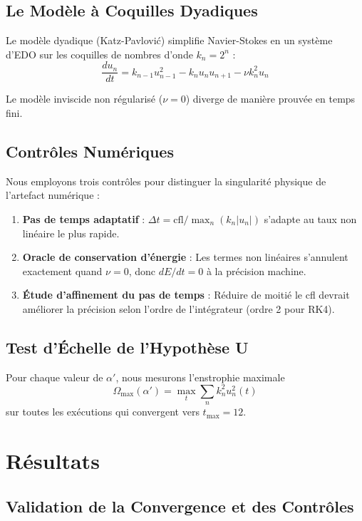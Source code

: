 \documentclass[11pt,a4paper]{article}
\begin{document}
\subsection{Le Modèle à Coquilles Dyadiques}

Le modèle dyadique (Katz-Pavlović) simplifie Navier-Stokes en un système d'EDO
sur les coquilles de nombres d'onde $k_n = 2^n$ :
\begin{equation}
\frac{du_n}{dt} = k_{n-1} u_{n-1}^2 - k_n u_n u_{n+1} - \nu k_n^2 u_n
\end{equation}

Le modèle inviscide non régularisé ($\nu=0$) diverge de manière prouvée en temps
fini.

\subsection{Contrôles Numériques}

Nous employons trois contrôles pour distinguer la singularité physique de
l'artefact numérique :

\begin{enumerate}
\item \textbf{Pas de temps adaptatif} : $\Delta t = \text{cfl} / \max_n(k_n|u_n|)$
s'adapte au taux non linéaire le plus rapide.

\item \textbf{Oracle de conservation d'énergie} : Les termes non linéaires
s'annulent exactement quand $\nu=0$, donc $dE/dt = 0$ à la précision machine.

\item \textbf{Étude d'affinement du pas de temps} : Réduire de moitié le cfl
devrait améliorer la précision selon l'ordre de l'intégrateur (ordre 2 pour RK4).
\end{enumerate}

\subsection{Test d'Échelle de l'Hypothèse U}

Pour chaque valeur de $\alpha'$, nous mesurons l'enstrophie maximale
\[ \Omega_{\max}(\alpha') = \max_t \sum_n k_n^2 u_n^2(t) \]
sur toutes les exécutions qui convergent vers $t_{\max} = 12$.

\section{Résultats}

\subsection{Validation de la Convergence et des Contrôles}
\end{document}
